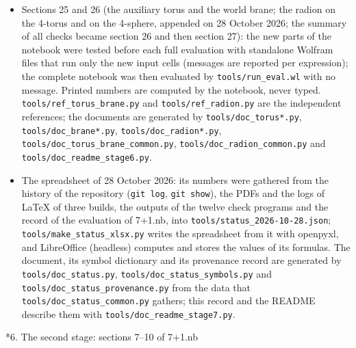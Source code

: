 \documentclass[10pt,a4paper]{article}
\makeatletter
\renewcommand\section{\@startsection{section}{1}{\z@}{-3.5ex \@plus -1ex \@minus -.2ex}{2.3ex \@plus.2ex}{\normalfont\Large\bfseries\raggedright}}
\makeatother
\begin{document}
\begin{itemize}
\item Sections 25 and 26 (the auxiliary torus and the world brane; the radion on the 4-torus and on the 4-sphere, appended on 28 October 2026; the summary of all checks became section 26 and then section 27): the new parts of the notebook were tested before each full evaluation with standalone Wolfram files that run only the new input cells (messages are reported per expression); the complete notebook was then evaluated by \texttt{tools/\allowbreak{}run\_\allowbreak{}eval.wl} with no message. Printed numbers are computed by the notebook, never typed. \texttt{tools/\allowbreak{}ref\_\allowbreak{}torus\_\allowbreak{}brane.py} and \texttt{tools/\allowbreak{}ref\_\allowbreak{}radion.py} are the independent references; the documents are generated by \texttt{tools/\allowbreak{}doc\_\allowbreak{}torus*.py}, \texttt{tools/\allowbreak{}doc\_\allowbreak{}brane*.py}, \texttt{tools/\allowbreak{}doc\_\allowbreak{}radion*.py}, \texttt{tools/\allowbreak{}doc\_\allowbreak{}torus\_\allowbreak{}brane\_\allowbreak{}common.py}, \texttt{tools/\allowbreak{}doc\_\allowbreak{}radion\_\allowbreak{}common.py} and \texttt{tools/\allowbreak{}doc\_\allowbreak{}readme\_\allowbreak{}stage6.py}.
\item The spreadsheet of 28 October 2026: its numbers were gathered from the history of the repository (\texttt{git log}, \texttt{git show}), the PDFs and the logs of LaTeX of three builds, the outputs of the twelve check programs and the record of the evaluation of 7+1.nb, into \texttt{tools/\allowbreak{}status\_\allowbreak{}2026-10-28.json}; \texttt{tools/\allowbreak{}make\_\allowbreak{}status\_\allowbreak{}xlsx.py} writes the spreadsheet from it with openpyxl, and LibreOffice (headless) computes and stores the values of its formulas. The document, its symbol dictionary and its provenance record are generated by \texttt{tools/\allowbreak{}doc\_\allowbreak{}status.py}, \texttt{tools/\allowbreak{}doc\_\allowbreak{}status\_\allowbreak{}symbols.py} and \texttt{tools/\allowbreak{}doc\_\allowbreak{}status\_\allowbreak{}provenance.py} from the data that \texttt{tools/\allowbreak{}doc\_\allowbreak{}status\_\allowbreak{}common.py} gathers; this record and the README describe them with \texttt{tools/\allowbreak{}doc\_\allowbreak{}readme\_\allowbreak{}stage7.py}.
\end{itemize}
\section*{6. The second stage: sections 7–10 of 7+1.nb}
\end{document}
